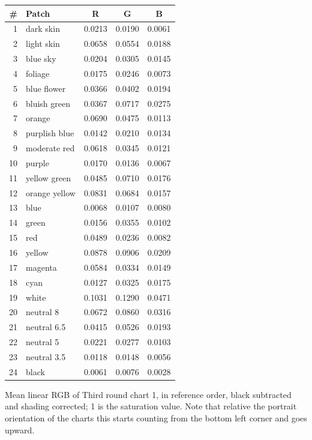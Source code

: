 \documentclass[11pt]{article}
\begin{document}
\begin{center}
\small
\begin{tabular}{rlccc}
\toprule
\# & Patch & R & G & B \\
\midrule
1 & dark skin & 0.0213 & 0.0190 & 0.0061 \\
2 & light skin & 0.0658 & 0.0554 & 0.0188 \\
3 & blue sky & 0.0204 & 0.0305 & 0.0145 \\
4 & foliage & 0.0175 & 0.0246 & 0.0073 \\
5 & blue flower & 0.0366 & 0.0402 & 0.0194 \\
6 & bluish green & 0.0367 & 0.0717 & 0.0275 \\
7 & orange & 0.0690 & 0.0475 & 0.0113 \\
8 & purplish blue & 0.0142 & 0.0210 & 0.0134 \\
9 & moderate red & 0.0618 & 0.0345 & 0.0121 \\
10 & purple & 0.0170 & 0.0136 & 0.0067 \\
11 & yellow green & 0.0485 & 0.0710 & 0.0176 \\
12 & orange yellow & 0.0831 & 0.0684 & 0.0157 \\
13 & blue & 0.0068 & 0.0107 & 0.0080 \\
14 & green & 0.0156 & 0.0355 & 0.0102 \\
15 & red & 0.0489 & 0.0236 & 0.0082 \\
16 & yellow & 0.0878 & 0.0906 & 0.0209 \\
17 & magenta & 0.0584 & 0.0334 & 0.0149 \\
18 & cyan & 0.0127 & 0.0325 & 0.0175 \\
19 & white & 0.1031 & 0.1290 & 0.0471 \\
20 & neutral 8 & 0.0672 & 0.0860 & 0.0316 \\
21 & neutral 6.5 & 0.0415 & 0.0526 & 0.0193 \\
22 & neutral 5 & 0.0221 & 0.0277 & 0.0103 \\
23 & neutral 3.5 & 0.0118 & 0.0148 & 0.0056 \\
24 & black & 0.0061 & 0.0076 & 0.0028 \\
\bottomrule
\end{tabular}
\end{center}
\noindent Mean linear RGB of Third round chart 1, in reference order, black subtracted and shading corrected; 1 is the saturation value. Note that relative the portrait orientation of the charts this starts counting from the bottom left corner and goes upward.
\end{document}

